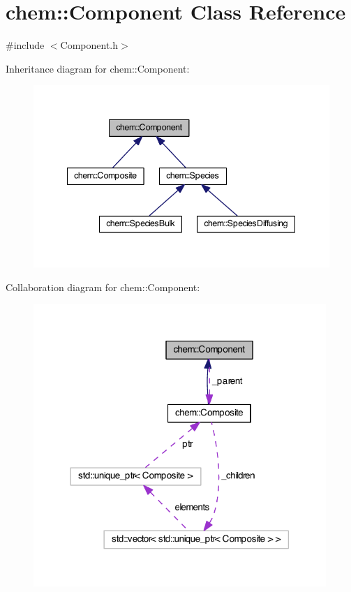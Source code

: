 \hypertarget{classchem_1_1Component}{\section{chem\-:\-:Component Class Reference}
\label{classchem_1_1Component}
}


{\ttfamily \#include $<$Component.\-h$>$}



Inheritance diagram for chem\-:\-:Component\-:\nopagebreak
\begin{figure}[H]
\begin{center}
\leavevmode
\includegraphics[width=345pt]{classchem_1_1Component__inherit__graph}
\end{center}
\end{figure}


Collaboration diagram for chem\-:\-:Component\-:\nopagebreak
\begin{figure}[H]
\begin{center}
\leavevmode
\includegraphics[width=314pt]{classchem_1_1Component__coll__graph}
\end{center}
\end{figure}
